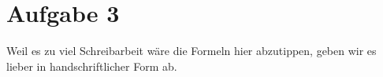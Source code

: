 \pagebreak
\section*{Aufgabe 3}
Weil es zu viel Schreibarbeit wäre die Formeln hier abzutippen, geben wir es lieber in handschriftlicher Form ab. \\
